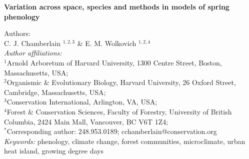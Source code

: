 \documentclass{article}\usepackage[]{graphicx}\usepackage[]{color}
\begin{document}
\noindent\textbf{\Large{Variation across space, species and methods in models of spring phenology}}

\noindent Authors:\\
C. J. Chamberlain $^{1,2,3}$ \& E. M. Wolkovich $^{1,2,4}$
\vspace{2ex}\\
\emph{Author affiliations:}\\
$^{1}$Arnold Arboretum of Harvard University, 1300 Centre Street, Boston, Massachusetts, USA; \\
$^{2}$Organismic \& Evolutionary Biology, Harvard University, 26 Oxford Street, Cambridge, Massachusetts, USA; \\
$^{3}$Conservation International, Arlington, VA, USA;\\
$^{4}$Forest \& Conservation Sciences, Faculty of Forestry, University of British Columbia, 2424 Main Mall, Vancouver, BC V6T 1Z4;\\
\vspace{2ex}
$^*$Corresponding author: 248.953.0189; cchamberlain@conservation.org\\

\noindent \emph{Keywords:} phenology, climate change, forest communities, microclimate, urban heat island, growing degree days\\

\renewcommand{\thetable}{\arabic{table}}
\renewcommand{\thefigure}{\arabic{figure}}
\renewcommand{\labelitemi}{$-$}



\newpage
\end{document}
